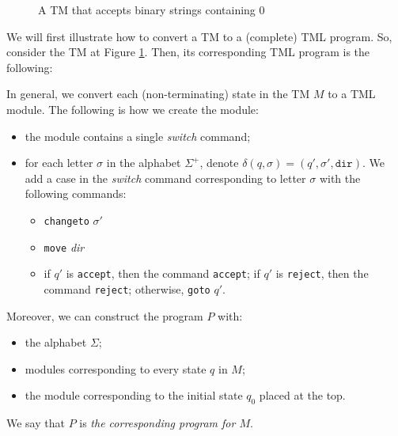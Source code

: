 \begin{appendices}
\begin{figure}[htb]
    \caption{A TM that accepts binary strings containing 0}
    \label{fig:simple_tm}
\end{figure}
We will first illustrate how to convert a TM to a (complete) TML program. So, consider the TM at Figure \ref{fig:simple_tm}. Then, its corresponding TML program is the following:

In general, we convert each (non-terminating) state in the TM $M$ to a TML module. The following is how we create the module:
\begin{itemize}
    \item the module contains a single \textit{switch} command;
    \item for each letter $\sigma$ in the alphabet $\Sigma^+$, denote $\delta(q, \sigma) = (q', \sigma', \texttt{dir})$. We add a case in the \textit{switch} command corresponding to letter $\sigma$ with the following commands:
    \begin{itemize}
        \item \texttt{changeto} $\sigma'$
        \item \texttt{move} \textit{dir}
        \item if $q'$ is \texttt{accept}, then the command \texttt{accept}; if $q'$ is \texttt{reject}, then the command \texttt{reject}; otherwise, \texttt{goto} $q'$.
    \end{itemize}
\end{itemize}
Moreover, we can construct the program $P$ with:
\begin{itemize}
    \item the alphabet $\Sigma$;
    \item modules corresponding to every state $q$ in $M$;
    \item the module corresponding to the initial state $q_0$ placed at the top.
\end{itemize}
We say that $P$ is \emph{the corresponding program for $M$}.


\end{appendices}
